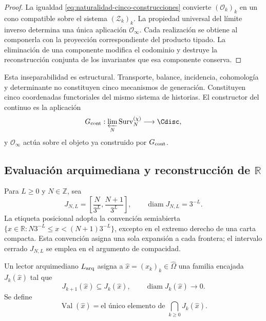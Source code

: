\begin{proof}
La igualdad \eqref{eq:naturalidad-cinco-construcciones} convierte
\((\mathcal O_k)_k\) en un cono compatible sobre el sistema
\((\mathcal Z_k)_k\). La propiedad universal del límite inverso determina
una única aplicación \(\mathcal O_\infty\). Cada realización se obtiene al
componerla con la proyección correspondiente del producto tipado. La
eliminación de una componente modifica el codominio y destruye la
reconstrucción conjunta de los invariantes que esa componente conserva.
\end{proof}

Esta inseparabilidad es estructural. Transporte, balance, incidencia,
cohomología y determinante no constituyen cinco mecanismos de generación.
Constituyen cinco coordenadas functoriales del mismo sistema de historias.
El constructor del continuo es la aplicación
\begin{equation}
 G_{\rm cont}:
 \varprojlim_N\operatorname{Surv}^{(\chi)}_N
 \longrightarrow\Cdisc,
 \label{eq:constructor-conjunto-continuo}
\end{equation}
y \(\mathcal O_\infty\) actúa sobre el objeto ya construido por
\(G_{\rm cont}\).

\subsection{Evaluación arquimediana y reconstrucción de
\texorpdfstring{\(\mathbb R\)}{R}}

Para \(L\geq0\) y \(N\in\mathbb Z\), sea
\begin{equation}
 J_{N,L}=
 \left[\frac{N}{3^L},\frac{N+1}{3^L}\right],
 \qquad
 \operatorname{diam}J_{N,L}=3^{-L}.
 \label{eq:cilindros-ternarios-cerrados}
\end{equation}
La etiqueta posicional adopta la convención semiabierta
\(\{x\in\mathbb R:N3^{-L}\leq x<(N+1)3^{-L}\}\), excepto en el extremo derecho de una carta
compacta. Esta convención asigna una sola expansión a cada frontera; el
intervalo cerrado \(J_{N,L}\) se emplea en el argumento de compacidad.

Un lector arquimediano \(L_{\rm arq}\) asigna a
\(\widehat x=(x_k)_k\in\widehat\Omega\) una familia encajada
\(J_k(\widehat x)\) tal que
\begin{equation}
 J_{k+1}(\widehat x)\subseteq J_k(\widehat x),
 \qquad
 \operatorname{diam}J_k(\widehat x)\longrightarrow0.
 \label{eq:encaje-contraccion-arquimediana}
\end{equation}
Se define
\begin{equation}
 \operatorname{Val}(\widehat x)
 =\text{el único elemento de }
 \bigcap_{k\geq0}J_k(\widehat x).
 \label{eq:evaluacion-arquimediana-definitiva}
\end{equation}


